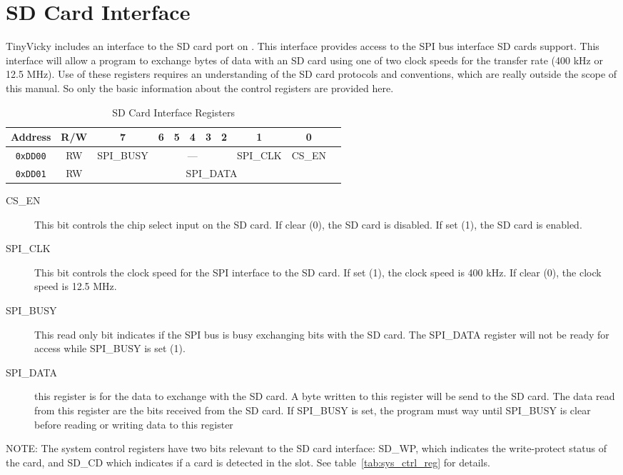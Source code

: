 \chapter{SD Card Interface}

TinyVicky includes an interface to the SD card port on \jr. This interface provides access to the SPI bus interface SD cards support. This interface will allow a program to exchange bytes of data with an SD card using one of two clock speeds for the transfer rate (400 kHz or 12.5 MHz).  Use of these registers requires an understanding of the SD card protocols and conventions, which are really outside the scope of this manual. So only the basic information about the control registers are provided here.

\begin{table}[ht]
    \begin{center}
        \begin{tabular}{|c|c|c|c|c|c|c|c|c|c|c|} \hline
            Address & R/W & 7 & 6 & 5 & 4 & 3 & 2 & 1 & 0 \\\hline\hline
            \verb+0xDD00+ & RW & SPI\_BUSY & \multicolumn{5}{|c|}{---} & SPI\_CLK & CS\_EN \\\hline
            \verb+0xDD01+ & RW & \multicolumn{8}{|c|}{SPI\_DATA} \\\hline
        \end{tabular}
    \end{center}
    \caption{SD Card Interface Registers}
\end{table}

\begin{description}
    \item[CS\_EN] This bit controls the chip select input on the SD card. If clear (0), the SD card is disabled. If set (1), the SD card is enabled.
    \item[SPI\_CLK] This bit controls the clock speed for the SPI interface to the SD card. If set (1), the clock speed is 400 kHz. If clear (0), the clock speed is 12.5 MHz.
    \item[SPI\_BUSY] This read only bit indicates if the SPI bus is busy exchanging bits with the SD card. The SPI\_DATA register will not be ready for access while SPI\_BUSY is set (1).
    \item[SPI\_DATA] this register is for the data to exchange with the SD card. A byte written to this register will be send to the SD card. The data read from this register are the bits received from the SD card. If SPI\_BUSY is set, the program must way until SPI\_BUSY is clear before reading or writing data to this register
\end{description}

NOTE: The system control registers have two bits relevant to the SD card interface: SD\_WP, which indicates the write-protect status of the card, and SD\_CD which indicates if a card is detected in the slot. See table~\ref{tab:sys_ctrl_reg} for details.
